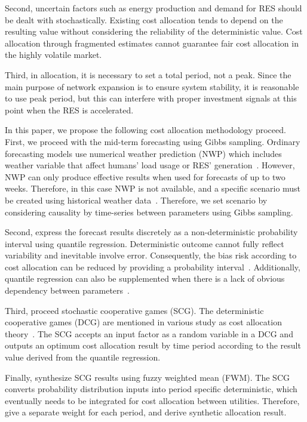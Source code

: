 \documentclass[journal]{IEEEtran} %
\begin{document}
Second, uncertain factors such as energy production and demand for RES should be dealt with stochastically. Existing cost allocation tends to depend on the resulting value without considering the reliability of the deterministic value. Cost allocation through fragmented estimates cannot guarantee fair cost allocation in the highly volatile market. 

Third, in allocation, it is necessary to set a total period, not a peak. Since the main purpose of network expansion is to ensure system stability, it is reasonable to use peak period, but this can interfere with proper investment signals at this point when the RES is accelerated.

In this paper, we propose the following cost allocation methodology proceed. First, we proceed with the mid-term forecasting using Gibbs sampling. Ordinary forecasting models use numerical weather prediction (NWP) which includes weather variable that affect humans' load usage or RES' generation~\cite{Xie2016a}. However, NWP can only produce effective results when used for forecasts of up to two weeks. Therefore, in this case NWP is not available, and a specific scenario must be created using historical weather data~\cite{Xie2016a}. Therefore, we set scenario by considering causality by time-series between parameters using Gibbs sampling.

Second, express the forecast results discretely as a non-deterministic probability interval using quantile regression. Deterministic outcome cannot fully reflect variability and inevitable involve error. Consequently, the bias risk according to cost allocation can be reduced by providing a probability interval~\cite{cade2003gentle}. Additionally, quantile regression can also be supplemented when there is a lack of obvious dependency between parameters~\cite{koenker2001quantile}.

Third, proceed stochastic cooperative games (SCG). The deterministic cooperative games (DCG) are mentioned in various study as cost allocation theory~\cite{tsukamoto1996allocation, ruiz2007effective, evans2003cost, erli2005transmission, Zolezzi2002}. The SCG accepts an input factor as a random variable in a DCG and outputs an optimum cost allocation result by time period according to the result value derived from the quantile regression.

Finally, synthesize SCG results using fuzzy weighted mean (FWM). The SCG converts probability distribution inputs into period specific deterministic, which eventually needs to be integrated for cost allocation between utilities. Therefore, give a separate weight for each period, and derive synthetic allocation result.
\end{document}
